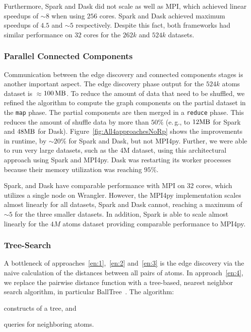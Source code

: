 Furthermore, Spark and Dask did not scale as well as MPI, which achieved linear speedups of $\sim8$ when using $256$ cores.
Spark and Dask achieved maximum speedups of $4.5$ and $\sim5$ respectively.
Despite this fact, both frameworks had similar performance on $32$ cores for the $262k$ and $524k$ datasets.


\subsubsection{Parallel Connected Components}
Communication between the edge discovery and connected components stages is another important aspect.
The edge discovery phase output for the $524k$ atoms dataset is $\approx$$100\,\textup{MB}$.
To reduce the amount of data that need to be shuffled, we refined the algorithm to compute the graph components on the partial dataset in the \texttt{map} phase.
The partial components are then merged in a \texttt{reduce} phase.
This reduces the amount of shuffle data by more than $50\%$ (e.\,g., to $12\textup{MB}$ for Spark and $48\textup{MB}$ for Dask).
Figure~\ref{fig:All4approachesNoRp} shows the improvements in runtime, by $\sim20\%$ for Spark and Dask, but not MPI4py.
Further, we were able to run very large datasets, such as the 4M dataset, using this architectural approach using Spark and MPI4py.
Dask was restarting its worker processes because their memory utilization was reaching $95\%$.

Spark, and Dask have comparable performance with MPI on 32 cores, which utilizes a single node on Wrangler.
However, the MPI4py implementation scales almost linearly for all datasets, Spark and Dask cannot, reaching a maximum of $\sim5$ for the three smaller datasets.
In addition, Spark is able to scale almost linearly for the $4M$ atoms dataset providing comparable performance to MPI4py.


\subsubsection{Tree-Search}
A bottleneck of approaches~\ref{en:1},~\ref{en:2} and~\ref{en:3} is the edge 
discovery via the naive calculation of the distances between all pairs of atoms. 
In approach~\ref{en:4}, we replace the pairwise distance function with a tree-based, 
nearest neighbor search algorithm, in particular BallTree~\cite{omohundro89five}. 
The algorithm: 
\begin{inparaenum}
    \item constructs of a tree, and
    \item queries for neighboring atoms.
\end{inparaenum}

